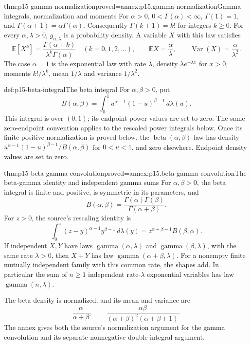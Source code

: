 \begin{hbtheorem}{thm:p15-gamma-normalization}{proved=annex:p15.gamma-normalization}{Gamma integrals, normalization and moments}
For \(\alpha>0\), \(0<\Gamma(\alpha)<\infty\),
\(\Gamma(1)=1\), and
\(\Gamma(\alpha+1)=\alpha\Gamma(\alpha)\). Consequently
\(\Gamma(k+1)=k!\) for integers \(k\geq0\).
For every \(\alpha,\lambda>0\), \(g_{\alpha,\lambda}\) is a
probability density. A variable \(X\) with this law satisfies
\[
 \mathbb E[X^k]=\frac{\Gamma(\alpha+k)}
                       {\lambda^k\Gamma(\alpha)}\quad(k=0,1,2,\ldots),
 \qquad
 \mathbb E X=\frac\alpha\lambda,\qquad
 \operatorname{Var}(X)=\frac\alpha{\lambda^2}.
\]
The case \(\alpha=1\) is the exponential law with rate \(\lambda\),
density \(\lambda e^{-\lambda x}\) for \(x>0\), moments
\(k!/\lambda^k\), mean \(1/\lambda\) and variance \(1/\lambda^2\).
\end{hbtheorem}

\begin{hbdefinition}{def:p15-beta-integral}{The beta integral}
For \(\alpha,\beta>0\), put
\[
B(\alpha,\beta)=\int_0^1
          u^{\alpha-1}(1-u)^{\beta-1}\,d\lambda(u).
\]
This integral is over \((0,1)\); its endpoint power values are set
to zero. The same zero-endpoint convention applies to the rescaled
power integrals below.
Once its finite positive normalization is proved below, the
\(\operatorname{beta}(\alpha,\beta)\) law has density
\(u^{\alpha-1}(1-u)^{\beta-1}/B(\alpha,\beta)\) for \(0<u<1\),
and zero elsewhere. Endpoint density values are set to zero.
\end{hbdefinition}

\begin{hbtheorem}{thm:p15-beta-gamma-convolution}{proved=annex:p15.beta-gamma-convolution}{The beta-gamma identity and independent gamma sums}
For \(\alpha,\beta>0\), the beta integral is finite and positive,
is symmetric in its parameters, and
\[
 B(\alpha,\beta)=\frac{\Gamma(\alpha)\Gamma(\beta)}{\Gamma(\alpha+\beta)}.
\]
For \(z>0\), the source's rescaling identity is
\[
 \int_0^z(z-y)^{\alpha-1}y^{\beta-1}\,d\lambda(y)
       =z^{\alpha+\beta-1}B(\beta,\alpha).
\]
If independent \(X,Y\) have laws
\(\operatorname{gamma}(\alpha,\lambda)\) and
\(\operatorname{gamma}(\beta,\lambda)\), with the same rate
\(\lambda>0\), then \(X+Y\) has law
\(\operatorname{gamma}(\alpha+\beta,\lambda)\).
For a nonempty finite mutually independent family with this common rate,
the shapes add. In particular the sum of \(n\geq1\) independent
rate-\(\lambda\) exponential variables has law
\(\operatorname{gamma}(n,\lambda)\).

The beta density is normalized, and its mean and variance are
\[
 \frac\alpha{\alpha+\beta},\qquad
 \frac{\alpha\beta}{(\alpha+\beta)^2(\alpha+\beta+1)}.
\]
The annex gives both the source's normalization argument for the gamma
convolution and its separate nonnegative double-integral argument.
\end{hbtheorem}

